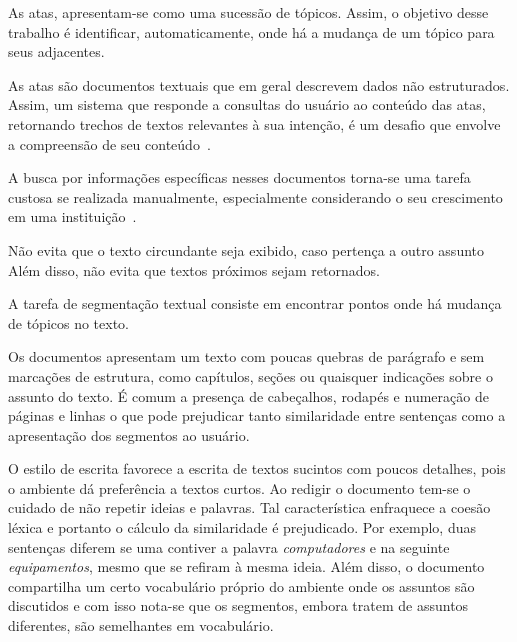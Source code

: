 As atas, apresentam-se como uma sucessão de tópicos. Assim, o objetivo desse trabalho é identificar, automaticamente, onde há a mudança de um tópico para seus adjacentes.




As atas são documentos textuais que em geral descrevem dados não estruturados. Assim, um sistema que responde a consultas do usuário ao conteúdo das atas, retornando trechos de textos relevantes à sua intenção, é um desafio que envolve a compreensão de seu conteúdo~\cite{Bokaei2015}. 



A busca por informações específicas nesses documentos torna-se uma tarefa custosa se realizada manualmente, especialmente considerando o seu crescimento em uma instituição~\cite{Lee2011, Masakazu2013, Miriam2013}.





Não evita que o texto circundante seja exibido, caso pertença a outro assunto
Além disso, não evita que textos próximos sejam retornados.

A tarefa de segmentação textual consiste em encontrar pontos onde há mudança de tópicos no texto.  %



 Os documentos apresentam um texto com poucas quebras de parágrafo e sem marcações de estrutura, como capítulos, seções ou quaisquer indicações sobre o assunto do texto. É comum a presença de cabeçalhos, rodapés e numeração de páginas e linhas o que pode prejudicar tanto similaridade entre sentenças como a apresentação dos segmentos ao usuário. %



O estilo de escrita favorece a escrita de textos sucintos com poucos detalhes, pois o ambiente dá preferência a textos curtos. Ao redigir o documento tem-se o cuidado de não repetir ideias e palavras. Tal característica enfraquece a coesão léxica e portanto o cálculo da similaridade é prejudicado. Por exemplo, duas sentenças diferem se uma contiver a palavra \textit{computadores} e na seguinte \textit{equipamentos}, mesmo que se refiram à mesma ideia. Além disso, o documento compartilha um certo vocabulário próprio do ambiente onde os assuntos são discutidos e com isso nota-se que os segmentos, embora tratem de assuntos diferentes, são semelhantes em vocabulário.


